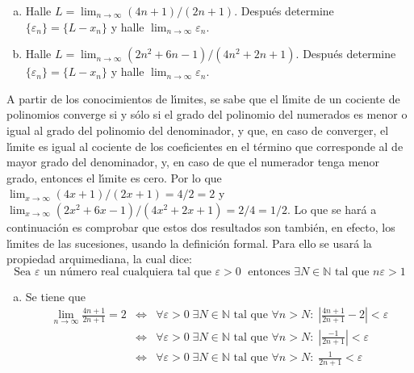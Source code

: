 \begin{enunciado}
 $\phantom{0}$
 \begin{enumerate}[(a)]
  \item Halle $L = \lim_{n\to\infty} (4n+1)/(2n+1)$. Despu\'es determine $\{ \varepsilon_n \} = \{ L - x_n \}$ y halle $\lim_{n\to\infty} \varepsilon_n$.
  
  \item Halle $L = \lim_{n\to\infty} (2n^2 + 6n -1)/(4n^2 + 2n + 1)$. Despu\'es determine $\{ \varepsilon_n \} = \{ L - x_n \}$ y halle $\lim_{n\to\infty} \varepsilon_n$.
 \end{enumerate}
\end{enunciado}

\begin{solucion}
 A partir de los conocimientos de l\'{\i}mites, se sabe que el l\'{\i}mite de un cociente de polinomios converge si y s\'olo si el grado del polinomio del numerados es menor o igual al grado del polinomio del denominador, y que, en caso de converger, el l\'{\i}mite es igual al cociente de los coeficientes en el t\'ermino que corresponde al de mayor grado del denominador, y, en caso de que el numerador tenga menor grado, entonces el l\'{\i}mite es cero. Por lo que $\lim_{x\to \infty} (4x+1)/(2x+1) = 4/2 = 2$ y $\lim_{x\to \infty} (2x^2+6x-1)/(4x^2+2x+1) = 2/4 = 1/2$. Lo que se har\'a a continuaci\'on es comprobar que estos dos resultados son tambi\'en, en efecto, los l\'{\i}mites de las sucesiones, usando la definici\'on formal. Para ello se usar\'a la propiedad arquimediana, la cual dice:
 \begin{equation*}
  \text{Sea } \varepsilon \text{ un n\'umero real cualquiera tal que } \varepsilon>0 \; \text{ entonces } \exists N \in \mathbb{N} \text{ tal que } n\varepsilon > 1
 \end{equation*}
 \begin{enumerate}[(a)]
  \item Se tiene que 
  \begin{eqnarray*}
   \lim_{n\to\infty} \frac{4n+1}{2n+1} = 2 & \Leftrightarrow & \forall \varepsilon > 0 \; \exists N\in\mathbb{N} \text{ tal que } \forall n > N: \; \left\lvert \frac{4n+1}{2n+1} - 2 \right\rvert < \varepsilon \\
   & \Leftrightarrow & \forall \varepsilon > 0 \; \exists N\in\mathbb{N} \text{ tal que } \forall n > N: \; \left\lvert \frac{-1}{2n+1} \right\rvert < \varepsilon \\
   & \Leftrightarrow & \forall \varepsilon > 0 \; \exists N\in\mathbb{N} \text{ tal que } \forall n > N: \; \frac{1}{2n+1} < \varepsilon \\

\end{eqnarray*}
\end{enumerate}
\end{solucion}
